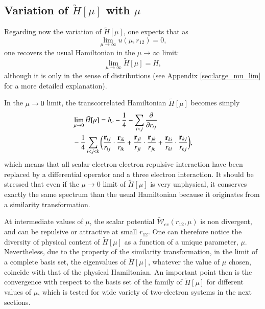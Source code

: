 \documentclass[aip,jcp,reprint,noshowkeys,superscriptaddress]{revtex4-1}
\newcommand{\deriv}[3]{\frac{\partial^{#3} #1}{\partial {#2}^{#3}}}
\newcommand{\bri}[1]{{\bf r}_{#1}}
\begin{document}
\subsection{Variation of $\tilde{H}[\mu]$ with $\mu$}
\label{sec:h_mu_lim}
Regarding now the variation of $\tilde{H}[\mu]$, one expects that as 
\begin{equation}
 \label{eq:lim_mu_0}
 \lim_{\mu  \rightarrow \infty }u(\mu,r_{12}) = 0, 
\end{equation}
one recovers the usual Hamiltonian in the ${\mu  \rightarrow \infty }$ limit:
\begin{equation}
 \label{eq:lim_mu_1}
 \lim_{\mu \rightarrow \infty} \tilde{H}[\mu] = H,
\end{equation}
although it is only in the sense of distributions (see Appendix \ref{sec:large_mu_lim} for a more detailed explanation). 

In the $\mu \rightarrow 0$ limit, the transcorrelated Hamiltonian $\tilde{H}[\mu]$ becomes simply 
\begin{equation}
 \label{eq:htilde_mu_low}
 \begin{aligned}
&\lim_{\mu \rightarrow 0} \tilde{H}[\mu] = h_c - \frac{1}{4} - \sum_{i<j}\deriv{}{r_{ij}}{} \\
 & - \frac{1}{4}\sum_{i<j<k}  \bigg(\frac{\bri{ij} }{ r_{ij}} \cdot \frac{\bri{ik} }{ r_{ik}} + \frac{\bri{ji} }{ r_{ji}} \cdot \frac{\bri{jk}  }{ r_{jk}} + \frac{\bri{ki} }{ r_{ki}} \cdot  \frac{\bri{kj} }{ r_{kj}} \bigg),
 \end{aligned}
\end{equation}
which means that all scalar electron-electron repulsive interaction have been replaced by a differential operator and a three electron interaction. 
It should be stressed that even if the $\mu \rightarrow 0$ limit of $\tilde{H}[\mu]$ is very unphysical, it conserves exactly the same spectrum than the usual Hamiltonian because it originates from a similarity transformation. 

At intermediate values of $\mu$, the scalar potential $\tilde{\mathcal{W}}_{ee}(r_{12},\mu) $ is non divergent, and can be repulsive or attractive at small $r_{12}$. One can therefore notice the diversity of physical content of $\tilde{H}[\mu]$ as a function of a unique parameter, $\mu$. 
Nevertheless, due to the property of the similarity transformation, in the limit of a complete basis set, the eigenvalues of $\tilde{H}[\mu]$, whatever the value of $\mu$ chosen, coincide with that of the physical Hamiltonian. An important point then is the convergence with respect to the basis set of the family of $\tilde{H}[\mu]$ for different values of $\mu$, which is tested for wide variety of two-electron systems in the next sections. 
\end{document}
